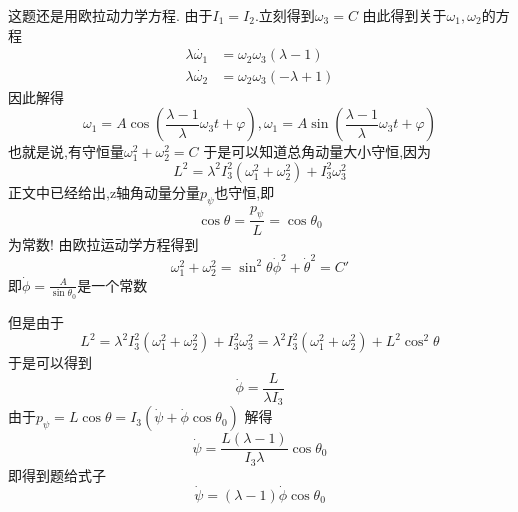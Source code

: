 \begin{solution}
    这题还是用欧拉动力学方程.
    由于$I_1=I_2$.立刻得到$\omega_3=C$
    由此得到关于$\omega_1,\omega_2$的方程
    \begin{align*}
        \lambda\dot{\omega_1}&=\omega_2\omega_3(\lambda-1)\\
        \lambda\dot{\omega_2}&=\omega_2\omega_3(-\lambda+1)
    \end{align*}
    因此解得
    $$\omega_1=A\cos(\frac{\lambda-1}{\lambda}\omega_3 t+\varphi),\omega_1=A\sin(\frac{\lambda-1}{\lambda}\omega_3 t+\varphi)$$
    也就是说,有守恒量$\omega_1^2+\omega_2^2=C$
    于是可以知道总角动量大小守恒,因为
    $$L^2=\lambda^2 I_3^2(\omega_1^2+\omega_2^2)+I_3^2\omega_3^2$$
    正文中已经给出,z轴角动量分量$p_\psi$也守恒,即
    $$\cos\theta=\frac{p_\psi}{L}=\cos\theta_0$$
    为常数!
    由欧拉运动学方程得到
    $$\omega_1^2+\omega_2^2=\sin^2\theta\dot\phi^2+\dot\theta^2=C'$$
    即$\dot\phi=\frac{A}{\sin\theta_0}$是一个常数
    
    但是由于$$L^2=\lambda^2I_3^2(\omega_1^2+\omega_2^2)+I_3^2\omega_3^2=\lambda^2 I_3^2(\omega_1^2+\omega_2^2)+L^2\cos^2\theta$$
    于是可以得到
    $$\dot\phi=\frac{L}{\lambda I_3}$$
    由于$p_\psi=L\cos\theta=I_3(\dot\psi+\dot\phi\cos\theta_0)$
    解得
    $$\dot\psi=\frac{L(\lambda-1)}{I_3\lambda}\cos\theta_0$$
    即得到题给式子
    $$\dot\psi=(\lambda-1)\dot\phi\cos\theta_0$$
\end{solution}

